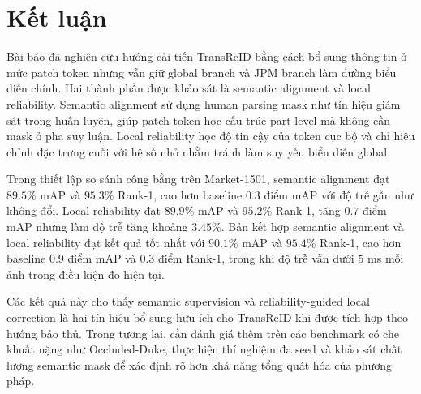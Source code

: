 \section{Kết luận}

Bài báo đã nghiên cứu hướng cải tiến TransReID bằng cách bổ sung thông tin ở
mức patch token nhưng vẫn giữ global branch và JPM branch làm đường biểu diễn
chính. Hai thành phần được khảo sát là semantic alignment và local reliability.
Semantic alignment sử dụng human parsing mask như tín hiệu giám sát trong huấn
luyện, giúp patch token học cấu trúc part-level mà không cần mask ở pha suy
luận. Local reliability học độ tin cậy của token cục bộ và chỉ hiệu chỉnh đặc
trưng cuối với hệ số nhỏ nhằm tránh làm suy yếu biểu diễn global.

Trong thiết lập so sánh công bằng trên Market-1501, semantic alignment đạt
$89.5\%$ mAP và $95.3\%$ Rank-1, cao hơn baseline $0.3$ điểm mAP với độ trễ
gần như không đổi. Local reliability đạt $89.9\%$ mAP và $95.2\%$ Rank-1, tăng
$0.7$ điểm mAP nhưng làm độ trễ tăng khoảng $3.45\%$. Bản kết hợp semantic
alignment và local reliability đạt kết quả tốt nhất với $90.1\%$ mAP và
$95.4\%$ Rank-1, cao hơn baseline $0.9$ điểm mAP và $0.3$ điểm Rank-1, trong
khi độ trễ vẫn dưới $5$ ms mỗi ảnh trong điều kiện đo hiện tại.

Các kết quả này cho thấy semantic supervision và reliability-guided local
correction là hai tín hiệu bổ sung hữu ích cho TransReID khi được tích hợp theo
hướng bảo thủ. Trong tương lai, cần đánh giá thêm trên các benchmark có che
khuất nặng như Occluded-Duke, thực hiện thí nghiệm đa seed và khảo sát chất
lượng semantic mask để xác định rõ hơn khả năng tổng quát hóa của phương pháp.
